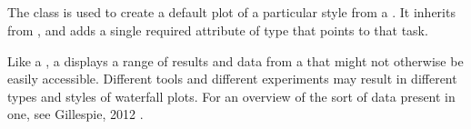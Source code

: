 \begin{blockChanged}
\subsection{}
\label{class:waterfallPlot}
The \WaterfallPlot class is used to create a default plot of a particular style from a \ParameterEstimationTask.  It inherits from \Plot, and adds a single required attribute  of type \SIdRef that points to that task.

Like a \ParameterEstimationResultPlot, a \WaterfallPlot displays a range of results and data from a \ParameterEstimationTask that might not otherwise be easily accessible.  Different tools and different experiments may result in different types and styles of waterfall plots.  For an overview of the sort of data present in one, see Gillespie, 2012 \citep{gillespie2012}.


\end{blockChanged}
